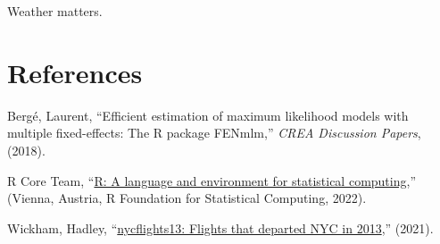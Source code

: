 \documentclass[
]{article}
\newlength{\cslhangindent}
\newenvironment{CSLReferences}[2] %
 {\begin{list}{}{%
  \setlength{\itemindent}{0pt}
  \setlength{\leftmargin}{0pt}
  \setlength{\parsep}{0pt}
  \ifodd #1
   \setlength{\leftmargin}{\cslhangindent}
   \setlength{\itemindent}{-1\cslhangindent}
  \fi
  \setlength{\itemsep}{#2\baselineskip}}}
 {\end{list}}
\begin{document}
Weather matters.

\section*{References}\label{references}

\label{refs}
\begin{CSLReferences}{1}{0}
Bergé, Laurent, {``Efficient estimation of maximum likelihood models
with multiple fixed-effects: The {R} package {FENmlm},''} \emph{CREA
Discussion Papers}, (2018).

R Core Team, {``\href{https://www.R-project.org/}{R: A language and
environment for statistical computing},''} (Vienna, Austria, R
Foundation for Statistical Computing, 2022).

Wickham, Hadley,
{``\href{https://CRAN.R-project.org/package=nycflights13}{nycflights13:
Flights that departed NYC in 2013},''} (2021).

\end{CSLReferences}
\end{document}
